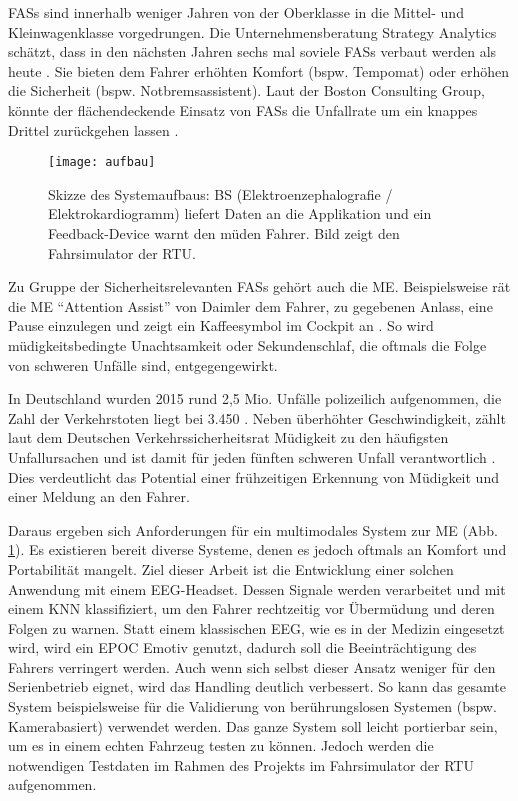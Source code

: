 \label{chap:intro}

\acl{FASs} sind innerhalb weniger Jahren von der Oberklasse in die Mittel- und Kleinwagenklasse vorgedrungen. Die Unternehmensberatung Strategy Analytics schätzt, dass in den nächsten Jahren sechs mal soviele \acl{FASs} verbaut werden als heute \cite{strategy_analytics}. Sie bieten dem Fahrer erhöhten Komfort (bspw. Tempomat) oder erhöhen die Sicherheit (bspw. Notbremsassistent). Laut der Boston Consulting Group, könnte der flächendeckende Einsatz von \acl{FASs} die Unfallrate um ein knappes Drittel zurückgehen lassen \cite{bcgperspectives}. 

\begin{figure}[h] 
  \begin{center}
    \texttt{[image: aufbau]}
    \caption[Skizze des Systemaufbaus]{Skizze des Systemaufbaus: \acl{BS} (Elektroenzephalografie / Elektrokardiogramm) liefert Daten an die Applikation und ein Feedback-Device warnt den müden Fahrer. Bild zeigt den Fahrsimulator der \acl{RTU}. \label{fig:sketch}}
  \end{center}
\end{figure}

Zu Gruppe der Sicherheitsrelevanten \acl{FASs} gehört auch die \acl{ME}. Beispielsweise rät die \acl{ME} "`Attention Assist"' von Daimler dem Fahrer, zu gegebenen Anlass, eine Pause einzulegen und zeigt ein Kaffeesymbol im Cockpit an \cite{Daimler}. So wird müdigkeitsbedingte Unachtsamkeit oder Sekundenschlaf, die oftmals die Folge von schweren Unfälle sind, entgegengewirkt.

In Deutschland wurden 2015 rund 2,5 Mio. Unfälle polizeilich aufgenommen, die Zahl der Verkehrstoten liegt bei 3.450 \cite{accident_statistic}. Neben überhöhter Geschwindigkeit, zählt laut dem Deutschen Verkehrssicherheitsrat Müdigkeit zu den häufigsten Unfallursachen und ist damit für jeden fünften schweren Unfall verantwortlich \cite{dvr_statistic}. Dies verdeutlicht das Potential einer frühzeitigen Erkennung von Müdigkeit und einer Meldung an den Fahrer.

\problemDetail

Daraus ergeben sich Anforderungen für ein multimodales System zur \acl{ME}  (Abb. \ref{fig:sketch}). Es existieren bereit diverse Systeme, denen es jedoch oftmals an Komfort und Portabilität mangelt. Ziel dieser Arbeit ist die Entwicklung einer solchen Anwendung mit einem EEG-Headset. 
Dessen Signale werden verarbeitet und mit einem KNN klassifiziert, um den Fahrer rechtzeitig vor Übermüdung und deren Folgen zu warnen.
Statt einem klassischen EEG, wie es in der Medizin eingesetzt wird, wird ein EPOC Emotiv genutzt, dadurch soll die Beeinträchtigung des Fahrers verringert werden. Auch wenn sich selbst dieser Ansatz weniger für den Serienbetrieb eignet, wird das Handling deutlich verbessert. So kann das gesamte System beispielsweise für die Validierung von berührungslosen Systemen (bspw. Kamerabasiert) verwendet werden. Das ganze System soll leicht portierbar sein, um es in einem echten Fahrzeug testen zu können. Jedoch werden die notwendigen Testdaten im Rahmen des Projekts im Fahrsimulator der \acl{RTU} aufgenommen.

\tofc